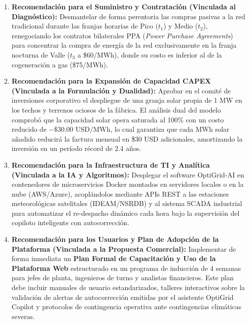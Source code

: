 \documentclass[11pt,a4paper]{article}
\begin{document}
\begin{enumerate}
    \item \textbf{Recomendación para el Suministro y Contratación (Vinculada al Diagnóstico):}  
    Desmantelar de forma perentoria las compras pasivas a la red tradicional durante las franjas horarias de Pico ($t_1$) y Medio ($t_2$), renegociando los contratos bilaterales PPA (\textit{Power Purchase Agreements}) para concentrar la compra de energía de la red exclusivamente en la franja nocturna de Valle ($t_3$ a \$60/MWh), donde su costo es inferior al de la cogeneración a gas (\$75/MWh).

    \item \textbf{Recomendación para la Expansión de Capacidad CAPEX (Vinculada a la Formulación y Dualidad):}  
    Aprobar en el comité de inversiones corporativo el despliegue de una granja solar propia de 1 MW en los techos y terrenos ociosos de la fábrica. El análisis dual del modelo comprobó que la capacidad solar opera saturada al 100\% con un costo reducido de $-\$30.00\text{ USD/MWh}$, lo cual garantiza que cada MWh solar añadido reducirá la factura mensual en \$30 USD adicionales, amortizando la inversión en un período récord de 2.4 años.

    \item \textbf{Recomendación para la Infraestructura de TI y Analítica (Vinculada a la IA y Algoritmos):}  
    Desplegar el software OptiGrid-AI en contenedores de microservicios Docker montados en servidores locales o en la nube (AWS/Azure), acoplándolos mediante APIs REST a las estaciones meteorológicas satelitales (IDEAM/NSRDB) y al sistema SCADA industrial para automatizar el re-despacho dinámico cada hora bajo la supervisión del copiloto inteligente con autocorrección.

    \item \textbf{Recomendación para los Usuarios y Plan de Adopción de la Plataforma (Vinculada a la Propuesta Comercial):}  
    Implementar de forma inmediata un \textbf{Plan Formal de Capacitación y Uso de la Plataforma Web} estructurado en un programa de inducción de 4 semanas para jefes de planta, ingenieros de turno y analistas financieros. Este plan debe incluir manuales de usuario estandarizados, talleres interactivos sobre la validación de alertas de autocorrección emitidas por el asistente OptiGrid Copilot y protocolos de contingencia operativa ante contingencias climáticas severas.
\end{enumerate}

\end{document}
